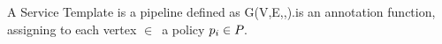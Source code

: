 

\begin{definition} \label{def:pipeline}

  A Service Template is a pipeline defined as G(V,E,\myLambda,\myGamma).\myGamma is an annotation function, assigning to each vertex $\in$\V\ a policy $p_i\in P_{}$.
\end{definition}





